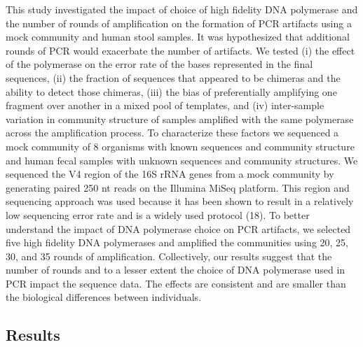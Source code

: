 \documentclass[11pt,]{article}
\begin{document}
This study investigated the impact of choice of high fidelity DNA
polymerase and the number of rounds of amplification on the formation of
PCR artifacts using a mock community and human stool samples. It was
hypothesized that additional rounds of PCR would exacerbate the number
of artifacts. We tested (i) the effect of the polymerase on the error
rate of the bases represented in the final sequences, (ii) the fraction
of sequences that appeared to be chimeras and the ability to detect
those chimeras, (iii) the bias of preferentially amplifying one fragment
over another in a mixed pool of templates, and (iv) inter-sample
variation in community structure of samples amplified with the same
polymerase across the amplification process. To characterize these
factors we sequenced a mock community of 8 organisms with known
sequences and community structure and human fecal samples with unknown
sequences and community structures. We sequenced the V4 region of the
16S rRNA genes from a mock community by generating paired 250 nt reads
on the Illumina MiSeq platform. This region and sequencing approach was
used because it has been shown to result in a relatively low sequencing
error rate and is a widely used protocol (18). To better understand the
impact of DNA polymerase choice on PCR artifacts, we selected five high
fidelity DNA polymerases and amplified the communities using 20, 25, 30,
and 35 rounds of amplification. Collectively, our results suggest that
the number of rounds and to a lesser extent the choice of DNA polymerase
used in PCR impact the sequence data. The effects are consistent and are
smaller than the biological differences between individuals.

\newpage

\hypertarget{results}{%
\subsection{Results}\label{results}}
\end{document}
